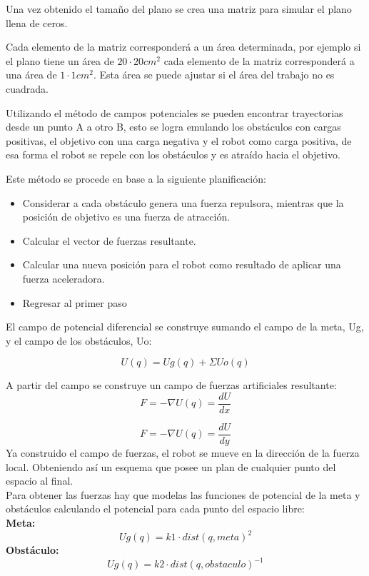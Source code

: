 \documentclass[journal, 10pt]{IEEEtran}
\begin{document}
Una vez obtenido el tamaño del plano se crea una matriz para simular el plano llena de ceros.

Cada elemento de la matriz corresponderá a un área determinada, por ejemplo si el plano tiene un área de $20\cdot20cm^2$ cada elemento de la matriz corresponderá a una área de $1\cdot1 cm^2$. Esta área se puede ajustar si el área del trabajo no es cuadrada.

Utilizando el método de campos potenciales se pueden encontrar trayectorias desde un punto A a otro B, esto se logra emulando los obstáculos con cargas positivas, el objetivo con una carga negativa y el robot como carga positiva, de esa forma el robot se repele con los obstáculos y es atraído hacia el objetivo.

Este método se procede en base a la siguiente planificación:
\begin{itemize}
    \item Considerar a cada obstáculo genera una fuerza repulsora, mientras que la posición de objetivo es una fuerza de atracción.
    \item Calcular el vector de fuerzas resultante.
    \item Calcular una nueva posición para el robot como resultado de aplicar una fuerza aceleradora.
    \item Regresar al primer paso
\end{itemize}

El campo de potencial diferencial se construye sumando el campo de la meta, Ug, y el campo de los obstáculos, Uo:

\begin{equation}
    U(q) = Ug(q) +\Sigma Uo(q)
\end{equation}

A partir del campo se construye un campo de fuerzas artificiales resultante:\\
\begin{equation}
     F= - \nabla U(q) = \frac{dU}{dx}
\end{equation}
   
\begin{equation}
    F= - \nabla U(q) = \frac{dU}{dy}
\end{equation}
Ya construido el campo de fuerzas, el robot se mueve en la dirección de la fuerza local. Obteniendo así un esquema que posee un plan de cualquier punto del espacio al final.\\
Para obtener las fuerzas hay que modelas las funciones de potencial de la meta y obstáculos calculando el potencial para cada punto del espacio libre:\\
\textbf{Meta:}
\begin{equation}
    Ug(q)=k1 \cdot dist(q,meta)^2
\end{equation}
\textbf{Obstáculo:}
\begin{equation}
    Ug(q)=k2 \cdot dist(q,obstaculo)^{-1}
\end{equation}
\end{document}

